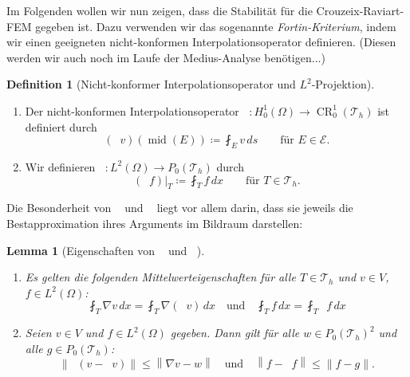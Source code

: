 \message{ !name(script.tex)}\documentclass[a4paper]{scrartcl}
\newcommand{\Hzero}{H_0^1}
\newcommand{\Ltwo}{L^2}
\newcommand{\crfem}{\operatorname{CR}_0^1}
\newcommand{\mesh}{\mathcal{T}_h}
\newcommand{\edges}{\mathcal{E}}
\newcommand{\dx}{\,dx}
\newcommand{\norm}[1]{\left\lVert#1\right\rVert}
\DeclareMathOperator{\nablah}{\nabla_{\textit{h}}}
\DeclareMathOperator{\midOp}{mid}
\DeclareMathOperator{\intOp}{I_{NC}}
\DeclareMathOperator{\LtwoOp}{\Pi_0}
\theoremstyle{plain}
\newtheorem{lemma}{Lemma}
\theoremstyle{definition}
\newtheorem{definition}{Definition}
\theoremstyle{remark}
\begin{document}
\noindent Im Folgenden wollen wir nun zeigen, dass die Stabilität für die
Crouzeix-Raviart-FEM gegeben ist. Dazu verwenden wir das sogenannte
\emph{Fortin-Kriterium}, indem wir einen geeigneten nicht-konformen
Interpolationsoperator definieren. {\color{red}(Diesen werden wir auch noch im
Laufe der Medius-Analyse benötigen...)}

\begin{definition}[Nicht-konformer Interpolationsoperator und
  \(\Ltwo\)-Projektion] \label{def:2}
  \begin{enumerate}[label=\emph{(\roman*)}]
  \item Der nicht-konformen Interpolationsoperator \(\intOp\colon
    \Hzero(\Omega) \rightarrow \crfem(\mesh)\) ist definiert durch
    \begin{equation}
      \label{eq:15}
      (\intOp v)(\midOp(E)) \coloneqq \fint_E v \,ds \qquad \text{für } E \in \edges. 
    \end{equation}
  \item Wir definieren \(\LtwoOp \colon \Ltwo(\Omega) \rightarrow
    P_0(\mesh)\) durch 
    \begin{equation}
      \label{eq:13}
      (\LtwoOp f)|_T \coloneqq \fint_T f \dx \qquad \text{für } T\in \mesh. 
    \end{equation}
  \end{enumerate}
\end{definition}

Die Besonderheit von \(\intOp\) und \(\LtwoOp\) liegt vor allem
darin, dass sie jeweils die Bestapproximation ihres Arguments im
Bildraum darstellen: 

\begin{lemma}[Eigenschaften von \(\intOp\) und \(\LtwoOp\)] \label{lem:1}
  \begin{enumerate}[label=(\roman*)]
  \item Es gelten die folgenden Mittelwerteigenschaften für alle 
    \(T\in\mesh\) und \(v\in V\), \(f\in\Ltwo(\Omega)\): 
    \begin{equation}
      \label{eq:16}
      \fint_T \nabla v \dx = \fint_T \nabla(\intOp v) \dx \quad \text{und} \quad
      \fint_T f \dx = \fint_T \LtwoOp f \dx 
    \end{equation}
  \item Seien \(v\in V\) und \(f\in \Ltwo(\Omega)\) gegeben. Dann gilt
    für alle \(w\in P_0(\mesh)^2\) und alle \(g\in P_0(\mesh)\): 
    \begin{equation}
      \label{eq:17}
      \norm{\nablah(v-\intOp v)} \leq \norm{\nabla v - w} \quad
      \text{und} \quad \norm{f-\LtwoOp f} \leq \norm{f-g}. 
    \end{equation}
  \end{enumerate}
\end{lemma}
\end{document}
